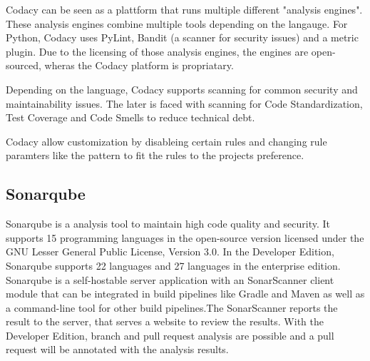 Codacy can be seen as a plattform that runs multiple different "analysis engines". These analysis engines combine multiple tools depending on the langauge. For Python, Codacy uses  PyLint, Bandit (a scanner for security issues) and a metric plugin.
Due to the licensing of those analysis engines, the engines are open-sourced, wheras the Codacy platform is propriatary.

Depending on the language, Codacy supports scanning for common security and maintainability issues. The later is faced with scanning for Code Standardization, Test Coverage and Code Smells to reduce technical debt.

Codacy allow customization by disableing certain rules and changing rule paramters like the pattern to fit the rules to the projects preference. 

\subsection{Sonarqube}
Sonarqube is a analysis tool to maintain high code quality and security. It supports 15 programming languages in the open-source version licensed under the GNU Lesser General Public License, Version 3.0. In the Developer Edition, Sonarqube supports 22 languages and 27 languages in the enterprise edition. Sonarqube is a self-hostable server application with an SonarScanner client module that can be integrated in build pipelines like Gradle and Maven as well as a command-line tool for other build pipelines.The SonarScanner reports the result to the server, that serves a website to review the results. With the Developer Edition, branch and pull request analysis are possible and a pull request will be annotated with the analysis results.

